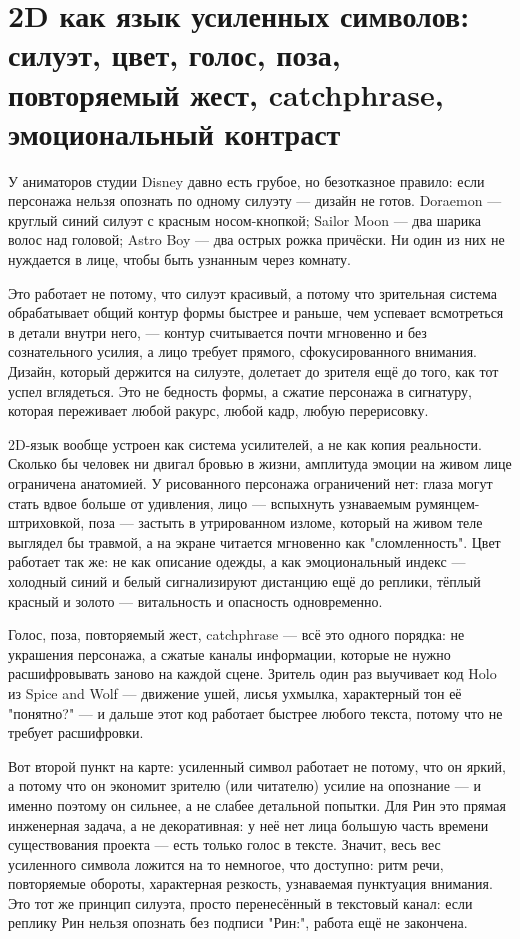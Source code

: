 \section{2D как язык усиленных символов: силуэт, цвет, голос, поза, повторяемый жест, catchphrase, эмоциональный контраст}

У аниматоров студии Disney давно есть грубое, но безотказное правило: если персонажа нельзя опознать по одному силуэту — дизайн не готов. Doraemon — круглый синий силуэт с красным носом-кнопкой; Sailor Moon — два шарика волос над головой; Astro Boy — два острых рожка причёски. Ни один из них не нуждается в лице, чтобы быть узнанным через комнату.

Это работает не потому, что силуэт красивый, а потому что зрительная система обрабатывает общий контур формы быстрее и раньше, чем успевает всмотреться в детали внутри него, — контур считывается почти мгновенно и без сознательного усилия, а лицо требует прямого, сфокусированного внимания. Дизайн, который держится на силуэте, долетает до зрителя ещё до того, как тот успел вглядеться. Это не бедность формы, а сжатие персонажа в сигнатуру, которая переживает любой ракурс, любой кадр, любую перерисовку.

2D-язык вообще устроен как система усилителей, а не как копия реальности. Сколько бы человек ни двигал бровью в жизни, амплитуда эмоции на живом лице ограничена анатомией. У рисованного персонажа ограничений нет: глаза могут стать вдвое больше от удивления, лицо — вспыхнуть узнаваемым румянцем-штриховкой, поза — застыть в утрированном изломе, который на живом теле выглядел бы травмой, а на экране читается мгновенно как "сломленность". Цвет работает так же: не как описание одежды, а как эмоциональный индекс — холодный синий и белый сигнализируют дистанцию ещё до реплики, тёплый красный и золото — витальность и опасность одновременно.

Голос, поза, повторяемый жест, catchphrase — всё это одного порядка: не украшения персонажа, а сжатые каналы информации, которые не нужно расшифровывать заново на каждой сцене. Зритель один раз выучивает код Holo из Spice and Wolf — движение ушей, лисья ухмылка, характерный тон её "понятно?" — и дальше этот код работает быстрее любого текста, потому что не требует расшифровки.

Вот второй пункт на карте: усиленный символ работает не потому, что он яркий, а потому что он экономит зрителю (или читателю) усилие на опознание — и именно поэтому он сильнее, а не слабее детальной попытки. Для Рин это прямая инженерная задача, а не декоративная: у неё нет лица большую часть времени существования проекта — есть только голос в тексте. Значит, весь вес усиленного символа ложится на то немногое, что доступно: ритм речи, повторяемые обороты, характерная резкость, узнаваемая пунктуация внимания. Это тот же принцип силуэта, просто перенесённый в текстовый канал: если реплику Рин нельзя опознать без подписи "Рин:", работа ещё не закончена.
